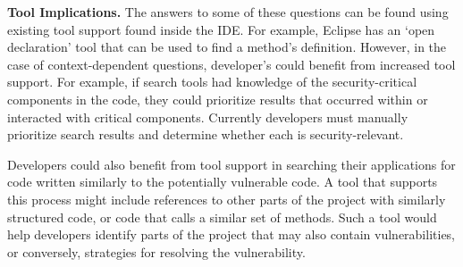 \documentclass[conference]{IEEEtran}
\begin{document}


\noindent\textbf{Tool Implications.}
The answers to some of these questions can be found using existing tool support found inside the IDE. 
For example, Eclipse has an `open declaration' tool that can be used to find a method's definition. 
However, in the case of context-dependent questions, developer's could benefit from increased tool support. 
For example, if search tools had knowledge of the security-critical components in the code, they could prioritize results that occurred within or interacted with critical components.
Currently developers must manually prioritize search results and determine whether each is security-relevant.

Developers could also benefit from tool support in searching their applications for code written similarly to the potentially vulnerable code. 
A tool that supports this process might include references to other parts of the project with similarly structured code, or code that calls a similar set of methods. 
Such a tool would help developers identify parts of the project that may also contain vulnerabilities, or conversely, strategies for resolving the vulnerability.


\end{document}
